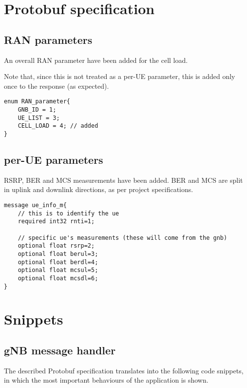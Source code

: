 \documentclass[a4paper,11pt]{article} %
\begin{document}
    \section{Protobuf specification}\label{sec:protobuf}

    \subsection{RAN parameters}\label{subsec:ran-parameters}

    An overall RAN parameter have been added for the cell load.

    Note that, since this is not treated as a per-UE parameter, this is added only once to the response (as expected).

    \begin{verbatim}
enum RAN_parameter{
    GNB_ID = 1;
    UE_LIST = 3;
    CELL_LOAD = 4; // added
}
    \end{verbatim}

    \subsection{per-UE parameters}\label{subsec:per-ue-parameters}

    RSRP, BER and MCS measurements have been added.
    BER and MCS are split in uplink and downlink directions, as per project specifications.

    \begin{verbatim}
message ue_info_m{
    // this is to identify the ue
    required int32 rnti=1;

    // specific ue's measurements (these will come from the gnb)
    optional float rsrp=2;
    optional float berul=3;
    optional float berdl=4;
    optional float mcsul=5;
    optional float mcsdl=6;
}
    \end{verbatim}


    \section{Snippets}\label{sec:snippets}

    \subsection{gNB message handler}\label{subsec:gnb-message-handler}

    The described Protobuf specification translates into the following code snippets, in which the most important behaviours of the application is shown.
\end{document}
